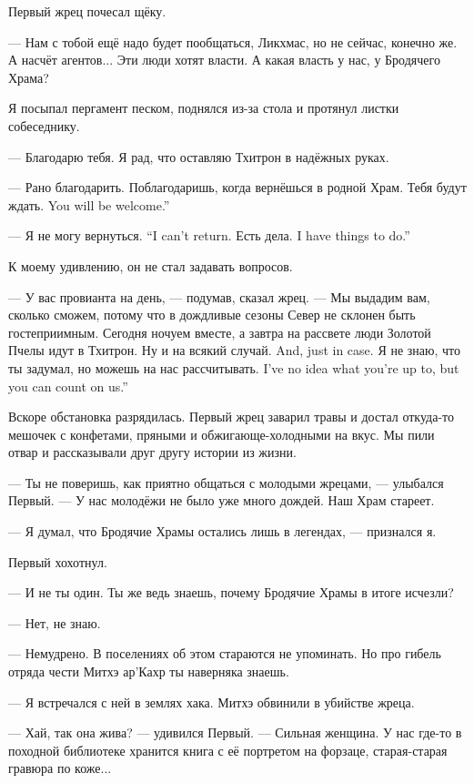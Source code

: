 Первый жрец почесал щёку.

--- Нам с тобой ещё надо будет пообщаться, Ликхмас, но не сейчас, конечно же.
А насчёт агентов...
Эти люди хотят власти.
А какая власть у нас, у Бродячего Храма?

Я посыпал пергамент песком, поднялся из-за стола и протянул листки собеседнику.

--- Благодарю тебя.
Я рад, что оставляю Тхитрон в надёжных руках.

--- Рано благодарить.
Поблагодаришь, когда вернёшься в родной Храм.
{Тебя будут ждать.}
{You will be welcome.''}

{--- Я не могу вернуться.}
{``I can't return.}
{Есть дела.}
{I have things to do.''}

К моему удивлению, он не стал задавать вопросов.

--- У вас провианта на день, --- подумав, сказал жрец.
--- Мы выдадим вам, сколько сможем, потому что в дождливые сезоны Север не склонен быть гостеприимным.
Сегодня ночуем вместе, а завтра на рассвете люди Золотой Пчелы идут в Тхитрон.
{Ну и на всякий случай.}
{And, just in case.}
{Я не знаю, что ты задумал, но можешь на нас рассчитывать.}
{I've no idea what you're up to, but you can count on us.''}

\asterism

Вскоре обстановка разрядилась.
Первый жрец заварил травы и достал откуда-то мешочек с конфетами, пряными и обжигающе-холодными на вкус.
Мы пили отвар и рассказывали друг другу истории из жизни.

--- Ты не поверишь, как приятно общаться с молодыми жрецами, --- улыбался Первый.
--- У нас молодёжи не было уже много дождей.
Наш Храм стареет.

--- Я думал, что Бродячие Храмы остались лишь в легендах, --- признался я.

Первый хохотнул.

--- И не ты один.
Ты же ведь знаешь, почему Бродячие Храмы в итоге исчезли?

--- Нет, не знаю.

--- Немудрено.
В поселениях об этом стараются не упоминать.
Но про гибель отряда чести Митхэ ар'Кахр ты наверняка знаешь.

--- Я встречался с ней в землях хака.
Митхэ обвинили в убийстве жреца.

--- Хай, так она жива? --- удивился Первый.
--- Сильная женщина.
У нас где-то в походной библиотеке хранится книга с её портретом на форзаце, старая-старая гравюра по коже...

